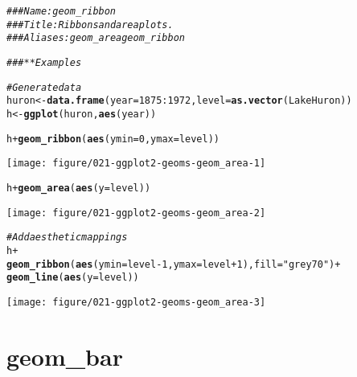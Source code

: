\documentclass[a4paper,titlepage]{tufte-handout}\usepackage[]{graphicx}\usepackage[]{color}
\makeatletter
\def\maxwidth{ %
  \ifdim\Gin@nat@width>\linewidth
    \linewidth
  \else
    \Gin@nat@width
  \fi
}
\newcommand{\hlnum}[1]{\textcolor[rgb]{0.686,0.059,0.569}{#1}}%
\newcommand{\hlstr}[1]{\textcolor[rgb]{0.192,0.494,0.8}{#1}}%
\newcommand{\hlcom}[1]{\textcolor[rgb]{0.678,0.584,0.686}{\textit{#1}}}%
\newcommand{\hlopt}[1]{\textcolor[rgb]{0,0,0}{#1}}%
\newcommand{\hlstd}[1]{\textcolor[rgb]{0.345,0.345,0.345}{#1}}%
\newcommand{\hlkwb}[1]{\textcolor[rgb]{0.69,0.353,0.396}{#1}}%
\newcommand{\hlkwc}[1]{\textcolor[rgb]{0.333,0.667,0.333}{#1}}%
\newcommand{\hlkwd}[1]{\textcolor[rgb]{0.737,0.353,0.396}{\textbf{#1}}}%
\newenvironment{kframe}{%
 \def\at@end@of@kframe{}%
 \ifinner\ifhmode%
  \def\at@end@of@kframe{\end{minipage}}%
  \begin{minipage}{\columnwidth}%
 \fi\fi%
 \def\FrameCommand##1{\hskip\@totalleftmargin \hskip-\fboxsep
 \colorbox{shadecolor}{##1}\hskip-\fboxsep
     \hskip-\linewidth \hskip-\@totalleftmargin \hskip\columnwidth}%
 \MakeFramed {\advance\hsize-\width
   \@totalleftmargin\z@ \linewidth\hsize
   \@setminipage}}%
 {\par\unskip\endMakeFramed%
 \at@end@of@kframe}
\newenvironment{knitrout}{}{} %
\makeatother
\begin{document}
\begin{knitrout}
\color{fgcolor}\begin{kframe}
\begin{alltt}
\hlcom{### Name: geom_ribbon}
\hlcom{### Title: Ribbons and area plots.}
\hlcom{### Aliases: geom_area geom_ribbon}

\hlcom{### ** Examples}

\hlcom{# Generate data}
\hlstd{huron} \hlkwb{<-} \hlkwd{data.frame}\hlstd{(}\hlkwc{year} \hlstd{=} \hlnum{1875}\hlopt{:}\hlnum{1972}\hlstd{,} \hlkwc{level} \hlstd{=} \hlkwd{as.vector}\hlstd{(LakeHuron))}
\hlstd{h} \hlkwb{<-} \hlkwd{ggplot}\hlstd{(huron,} \hlkwd{aes}\hlstd{(year))}

\hlstd{h} \hlopt{+} \hlkwd{geom_ribbon}\hlstd{(}\hlkwd{aes}\hlstd{(}\hlkwc{ymin}\hlstd{=}\hlnum{0}\hlstd{,} \hlkwc{ymax}\hlstd{=level))}
\end{alltt}
\end{kframe}
\texttt{[image: figure/021-ggplot2-geoms-geom\_area-1]} 
\begin{kframe}\begin{alltt}
\hlstd{h} \hlopt{+} \hlkwd{geom_area}\hlstd{(}\hlkwd{aes}\hlstd{(}\hlkwc{y} \hlstd{= level))}
\end{alltt}
\end{kframe}
\texttt{[image: figure/021-ggplot2-geoms-geom\_area-2]} 
\begin{kframe}\begin{alltt}
\hlcom{# Add aesthetic mappings}
\hlstd{h} \hlopt{+}
  \hlkwd{geom_ribbon}\hlstd{(}\hlkwd{aes}\hlstd{(}\hlkwc{ymin} \hlstd{= level} \hlopt{-} \hlnum{1}\hlstd{,} \hlkwc{ymax} \hlstd{= level} \hlopt{+} \hlnum{1}\hlstd{),} \hlkwc{fill} \hlstd{=} \hlstr{"grey70"}\hlstd{)} \hlopt{+}
  \hlkwd{geom_line}\hlstd{(}\hlkwd{aes}\hlstd{(}\hlkwc{y} \hlstd{= level))}
\end{alltt}
\end{kframe}
\texttt{[image: figure/021-ggplot2-geoms-geom\_area-3]} 

\end{knitrout}


\section{geom\_bar}
\end{document}
